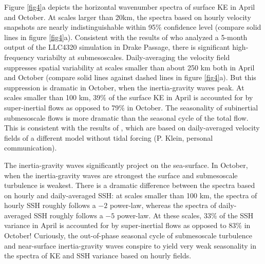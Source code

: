 \documentclass[grl]{agutex2015}
\begin{document}
\begin{article}
Figure \ref{fig4}a depicts the horizontal wavenumber spectra of surface KE in
April and October. At scales larger than 20km, the spectra based on hourly
velocity snapshots are nearly indistinguishable within 95$\%$ confidence level
(compare solid lines in figure \ref{fig4}a). Consistent with the results of
\citet{rocha_etal2016} who analyzed a 5-month output of the LLC4320 simulation in Drake Passage,
there is significant high-frequency variabilty at submesoscales. Daily-averaging
the velocity field suppresses spatial variability at scales smaller than about 250
km both in April and October (compare solid lines against dashed lines in figure
\ref{fig4}a). But this suppression is dramatic in October, when the inertia-gravity waves peak. At scales
smaller than 100 km, 39$\%$ of the surface KE in April is accounted for by super-inertial
flows as opposed to 79$\%$ in October. The seasonality of subinertial submesoscale flows
is more dramatic than the seasonal cycle of the total flow. This is consistent
with the results of \citet{sasaki_etal2014}, which are
based on daily-averaged velocity fields of a different model without tidal forcing
(P. Klein, personal communication).

The inertia-gravity waves significantly project on the sea-surface.
In October, when the inertia-gravity waves are strongest the surface and submesoscale
turbulence is weakest. There is a dramatic difference between the spectra
based on hourly and daily-averaged SSH: at scales smaller than 100 km, the spectra
of hourly SSH roughly follows a $-2$ power-law, whereas the spectra of daily-averaged
SSH roughly follows a $-5$ power-law. At these scales, 33$\%$ of the SSH variance in April is accounted for by super-inertial
flows as opposed to 83$\%$ in October! Curiously, the out-of-phase seasonal cycle of submesoscale
turbulence and near-surface inertia-gravity waves conspire to yield very weak seasonality
in the spectra of KE and SSH variance based on hourly fields.



\end{article}
\end{document}
